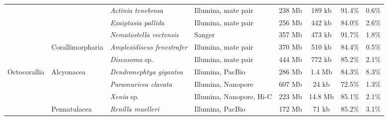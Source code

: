\begin{table}
{\begin{tabular}{llllcccc}
    & & \textit{Actinia tenebrosa} \cite{actinia_tenebrosa} & Illumina, mate pair & 238 Mb & 189 kb & 91.4\% & 0.6\% \\
    & & \textit{Exaiptasia pallida} \cite{exaiptasia_pallida} & Illumina, mate pair & 256 Mb & 442 kb & 84.0\% & 2.6\% \\
    & & \textit{Nematostella vectensis} \cite{nematostella_vectensis} & Sanger & 357 Mb & 473 kb & 91.7\% & 1.8\% \\
    & Corallimorpharia & \textit{Amplexidiscus fenestrafer} \cite{amplexidiscus_fenestrafer} & Illumina, mate pair & 370 Mb & 510 kb & 84.4\% & 0.5\% \\
    & & \textit{Discosoma} sp. \cite{amplexidiscus_fenestrafer} & Illumina, mate pair & 444 Mb & 772 kb & 85.2\% & 2.1\% \\
\hline
Octocorallia & Alcyonacea & \textit{Dendronephtya gigantea} \cite{dendronephthya_gigantea} & Illumina, PacBio & 286 Mb & 1.4 Mb & 84.3\% & 8.3\% \\
    & & \textit{Paramuricea clavata} \cite{paramuricea_clavata} & Illumina, Nanopore & 607 Mb & 24 kb & 72.5\% & 1.3\% \\
    & & \textit{Xenia} sp. \cite{xenia_sp} & Illumina, Nanopore, Hi-C & 223 Mb & 14.8 Mb & 85.1\% & 2.1\% \\
    & Pennatulacea & \textit{Renilla muelleri} \cite{renilla_muelleri} & Illumina, PacBio & 172 Mb & 71 kb & 85.2\% & 3.1\% \\
\hline
\end{tabular}
}
\label{tab:anthozoans}
\end{table}